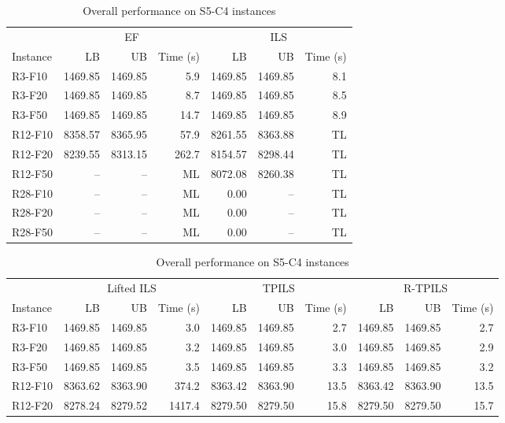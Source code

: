 \begin{table}[!htbp]
\centering
\footnotesize
\setlength{\tabcolsep}{3pt}
\caption{Overall performance on S5-C4 instances}
\label{tab:main-performance}
\begin{tabular*}{\linewidth}{@{\extracolsep{\fill}}l rrr rrr@{}}
\toprule
 & \multicolumn{3}{c}{EF} & \multicolumn{3}{c}{ILS} \\
\cmidrule(lr){2-4}\cmidrule(l){5-7}
Instance & LB & UB & Time (s) & LB & UB & Time (s) \\
\midrule
R3-F10 & 1469.85 & 1469.85 & 5.9 & 1469.85 & 1469.85 & 8.1 \\
R3-F20 & 1469.85 & 1469.85 & 8.7 & 1469.85 & 1469.85 & 8.5 \\
R3-F50 & 1469.85 & 1469.85 & 14.7 & 1469.85 & 1469.85 & 8.9 \\
\midrule
R12-F10 & 8358.57 & 8365.95 & 57.9 & 8261.55 & 8363.88 & TL \\
R12-F20 & 8239.55 & 8313.15 & 262.7 & 8154.57 & 8298.44 & TL \\
R12-F50 & -- & -- & ML & 8072.08 & 8260.38 & TL \\
\midrule
R28-F10 & -- & -- & ML & 0.00 & -- & TL \\
R28-F20 & -- & -- & ML & 0.00 & -- & TL \\
R28-F50 & -- & -- & ML & 0.00 & -- & TL \\
\bottomrule
\end{tabular*}
\par\medskip
\begin{tabular*}{\linewidth}{@{\extracolsep{\fill}}l rrr rrr rrr@{}}
\toprule
 & \multicolumn{3}{c}{Lifted ILS} & \multicolumn{3}{c}{TPILS} & \multicolumn{3}{c}{R-TPILS} \\
\cmidrule(lr){2-4}\cmidrule(lr){5-7}\cmidrule(l){8-10}
Instance & LB & UB & Time (s) & LB & UB & Time (s) & LB & UB & Time (s) \\
\midrule
R3-F10 & 1469.85 & 1469.85 & 3.0 & 1469.85 & 1469.85 & 2.7 & 1469.85 & 1469.85 & 2.7 \\
R3-F20 & 1469.85 & 1469.85 & 3.2 & 1469.85 & 1469.85 & 3.0 & 1469.85 & 1469.85 & 2.9 \\
R3-F50 & 1469.85 & 1469.85 & 3.5 & 1469.85 & 1469.85 & 3.3 & 1469.85 & 1469.85 & 3.2 \\
\midrule
R12-F10 & 8363.62 & 8363.90 & 374.2 & 8363.42 & 8363.90 & 13.5 & 8363.42 & 8363.90 & 13.5 \\
R12-F20 & 8278.24 & 8279.52 & 1417.4 & 8279.50 & 8279.50 & 15.8 & 8279.50 & 8279.50 & 15.7 \\

\end{tabular*}
\end{table}
